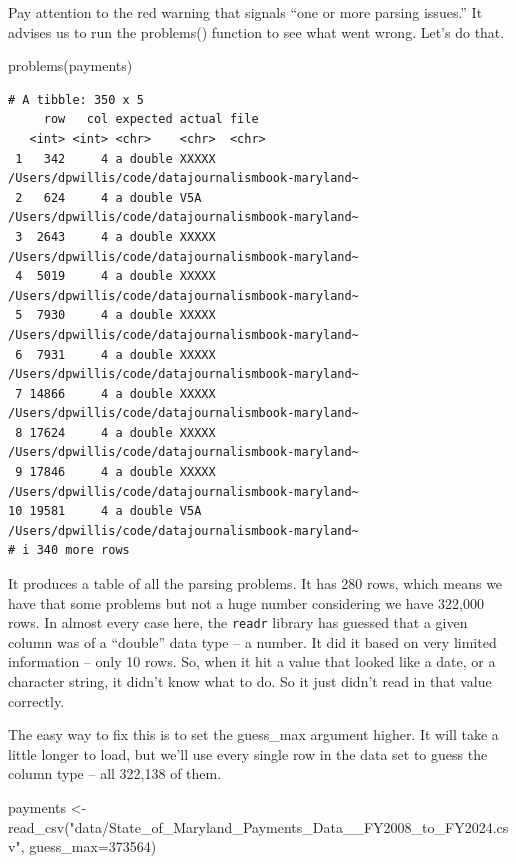 \documentclass[
  letterpaper,
  DIV=11,
  numbers=noendperiod]{scrreprt}
\newenvironment{Shaded}{\begin{snugshade}}{\end{snugshade}}
\newcommand{\AttributeTok}[1]{\textcolor[rgb]{0.40,0.45,0.13}{#1}}
\newcommand{\DecValTok}[1]{\textcolor[rgb]{0.68,0.00,0.00}{#1}}
\newcommand{\FunctionTok}[1]{\textcolor[rgb]{0.28,0.35,0.67}{#1}}
\newcommand{\NormalTok}[1]{\textcolor[rgb]{0.00,0.23,0.31}{#1}}
\newcommand{\OtherTok}[1]{\textcolor[rgb]{0.00,0.23,0.31}{#1}}
\newcommand{\StringTok}[1]{\textcolor[rgb]{0.13,0.47,0.30}{#1}}
\begin{document}
Pay attention to the red warning that signals ``one or more parsing
issues.'' It advises us to run the problems() function to see what went
wrong. Let's do that.

\begin{Shaded}
\begin{Highlighting}[]
\FunctionTok{problems}\NormalTok{(payments)}
\end{Highlighting}
\end{Shaded}

\begin{verbatim}
# A tibble: 350 x 5
     row   col expected actual file                                             
   <int> <int> <chr>    <chr>  <chr>                                            
 1   342     4 a double XXXXX  /Users/dpwillis/code/datajournalismbook-maryland~
 2   624     4 a double V5A    /Users/dpwillis/code/datajournalismbook-maryland~
 3  2643     4 a double XXXXX  /Users/dpwillis/code/datajournalismbook-maryland~
 4  5019     4 a double XXXXX  /Users/dpwillis/code/datajournalismbook-maryland~
 5  7930     4 a double XXXXX  /Users/dpwillis/code/datajournalismbook-maryland~
 6  7931     4 a double XXXXX  /Users/dpwillis/code/datajournalismbook-maryland~
 7 14866     4 a double XXXXX  /Users/dpwillis/code/datajournalismbook-maryland~
 8 17624     4 a double XXXXX  /Users/dpwillis/code/datajournalismbook-maryland~
 9 17846     4 a double XXXXX  /Users/dpwillis/code/datajournalismbook-maryland~
10 19581     4 a double V5A    /Users/dpwillis/code/datajournalismbook-maryland~
# i 340 more rows
\end{verbatim}

It produces a table of all the parsing problems. It has 280 rows, which
means we have that some problems but not a huge number considering we
have 322,000 rows. In almost every case here, the \texttt{readr} library
has guessed that a given column was of a ``double'' data type -- a
number. It did it based on very limited information -- only 10 rows. So,
when it hit a value that looked like a date, or a character string, it
didn't know what to do. So it just didn't read in that value correctly.

The easy way to fix this is to set the guess\_max argument higher. It
will take a little longer to load, but we'll use every single row in the
data set to guess the column type -- all 322,138 of them.

\begin{Shaded}
\begin{Highlighting}[]
\NormalTok{payments }\OtherTok{\textless{}{-}} \FunctionTok{read\_csv}\NormalTok{(}\StringTok{"data/State\_of\_Maryland\_Payments\_Data\_\_FY2008\_to\_FY2024.csv"}\NormalTok{, }\AttributeTok{guess\_max=}\DecValTok{373564}\NormalTok{)}
\end{Highlighting}
\end{Shaded}
\end{document}
